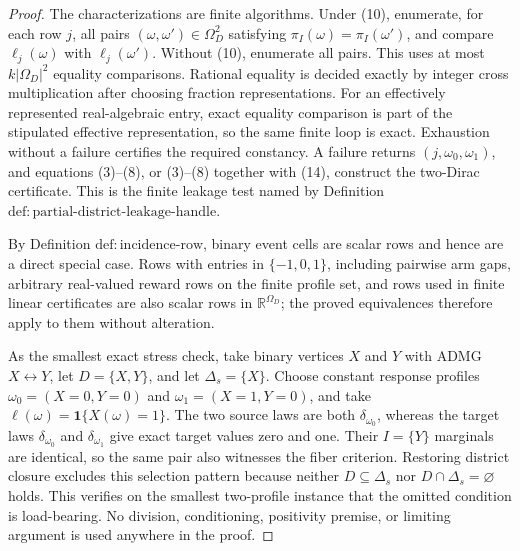 \documentclass{article}
\begin{document}
\begin{proof}
The characterizations are finite algorithms.  Under (10), enumerate, for each row \(j\), all pairs \((\omega,\omega')\in\Omega_D^2\) satisfying \(\pi_I(\omega)=\pi_I(\omega')\), and compare \(\ell_j(\omega)\) with \(\ell_j(\omega')\).  Without (10), enumerate all pairs.  This uses at most \(k|\Omega_D|^2\) equality comparisons.  Rational equality is decided exactly by integer cross multiplication after choosing fraction representations.  For an effectively represented real-algebraic entry, exact equality comparison is part of the stipulated effective representation, so the same finite loop is exact.  Exhaustion without a failure certifies the required constancy.  A failure returns \((j,\omega_0,\omega_1)\), and equations (3)--(8), or (3)--(8) together with (14), construct the two-Dirac certificate.  This is the finite leakage test named by Definition \(\mathrm{def:partial\text{-}district\text{-}leakage\text{-}handle}\).

By Definition \(\mathrm{def:incidence\text{-}row}\), binary event cells are scalar rows and hence are a direct special case.  Rows with entries in \(\{-1,0,1\}\), including pairwise arm gaps, arbitrary real-valued reward rows on the finite profile set, and rows used in finite linear certificates are also scalar rows in \(\mathbb R^{\Omega_D}\); the proved equivalences therefore apply to them without alteration.

As the smallest exact stress check, take binary vertices \(X\) and \(Y\) with ADMG \(X\leftrightarrow Y\), let \(D=\{X,Y\}\), and let \(\Delta_s=\{X\}\).  Choose constant response profiles \(\omega_0=(X=0,Y=0)\) and \(\omega_1=(X=1,Y=0)\), and take \(\ell(\omega)=\mathbf 1\{X(\omega)=1\}\).  The two source laws are both \(\delta_{\omega_0}\), whereas the target laws \(\delta_{\omega_0}\) and \(\delta_{\omega_1}\) give exact target values zero and one.  Their \(I=\{Y\}\) marginals are identical, so the same pair also witnesses the fiber criterion.  Restoring district closure excludes this selection pattern because neither \(D\subseteq\Delta_s\) nor \(D\cap\Delta_s=\varnothing\) holds.  This verifies on the smallest two-profile instance that the omitted condition is load-bearing.  No division, conditioning, positivity premise, or limiting argument is used anywhere in the proof.
\end{proof}
\end{document}
